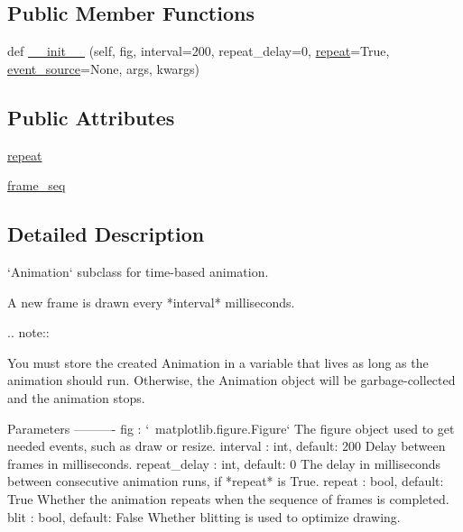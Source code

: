 \subsection*{Public Member Functions}
\begin{DoxyCompactItemize}
\item 
def \hyperlink{classmatplotlib_1_1animation_1_1TimedAnimation_acd99cb9fb1372fb68a16652d9d2103ad}{\+\_\+\+\_\+init\+\_\+\+\_\+} (self, fig, interval=200, repeat\+\_\+delay=0, \hyperlink{classmatplotlib_1_1animation_1_1TimedAnimation_a20b38c630b623b4957f7c7b16426908a}{repeat}=True, \hyperlink{classmatplotlib_1_1animation_1_1Animation_a7c178d14af9c70d7dc3de5dc78b7a70a}{event\+\_\+source}=None, args, kwargs)
\end{DoxyCompactItemize}
\subsection*{Public Attributes}
\begin{DoxyCompactItemize}
\item 
\hyperlink{classmatplotlib_1_1animation_1_1TimedAnimation_a20b38c630b623b4957f7c7b16426908a}{repeat}
\item 
\hyperlink{classmatplotlib_1_1animation_1_1TimedAnimation_a829d5fa6534792293c3331ae3b78f0bd}{frame\+\_\+seq}
\end{DoxyCompactItemize}


\subsection{Detailed Description}
\begin{DoxyVerb}`Animation` subclass for time-based animation.

A new frame is drawn every *interval* milliseconds.

.. note::

    You must store the created Animation in a variable that lives as long
    as the animation should run. Otherwise, the Animation object will be
    garbage-collected and the animation stops.

Parameters
----------
fig : `~matplotlib.figure.Figure`
    The figure object used to get needed events, such as draw or resize.
interval : int, default: 200
    Delay between frames in milliseconds.
repeat_delay : int, default: 0
    The delay in milliseconds between consecutive animation runs, if
    *repeat* is True.
repeat : bool, default: True
    Whether the animation repeats when the sequence of frames is completed.
blit : bool, default: False
    Whether blitting is used to optimize drawing.
\end{DoxyVerb}
 

